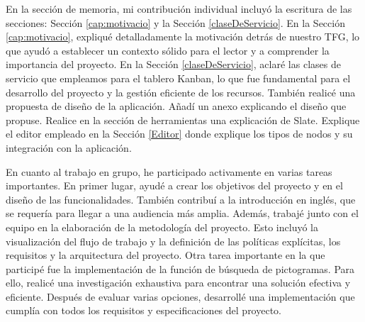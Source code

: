 En la sección de memoria, mi contribución individual incluyó la escritura de las secciones: Sección \ref{cap:motivacio} y la Sección \ref{claseDeServicio}. En la Sección \ref{cap:motivacio}, expliqué detalladamente la motivación detrás de nuestro TFG, lo que ayudó a establecer un contexto sólido para el lector y a comprender la importancia del proyecto. En la Sección \ref{claseDeServicio}, aclaré las clases de servicio que empleamos para el tablero Kanban, lo que fue fundamental para el desarrollo del proyecto y la gestión eficiente de los recursos. También realicé una propuesta de diseño de la aplicación. Añadí un anexo explicando el diseño que propuse. Realice en la sección de herramientas una explicación de Slate. Explique el editor empleado en la Sección \ref{Editor} donde explique los tipos de nodos y su integración con la aplicación.

En cuanto al trabajo en grupo, he participado activamente en varias tareas importantes. En primer lugar, ayudé a crear los objetivos del proyecto y en el diseño de las funcionalidades. También contribuí a la introducción en inglés, que se requería para llegar a una audiencia más amplia. Además, trabajé junto con el equipo en la elaboración de la metodología del proyecto. Esto incluyó la visualización del flujo de trabajo y la definición de las políticas explícitas, los requisitos y la arquitectura del proyecto. Otra tarea importante en la que participé fue la implementación de la función de búsqueda de pictogramas. Para ello, realicé una investigación exhaustiva para encontrar una solución efectiva y eficiente. Después de evaluar varias opciones, desarrollé una implementación que cumplía con todos los requisitos y especificaciones del proyecto.
